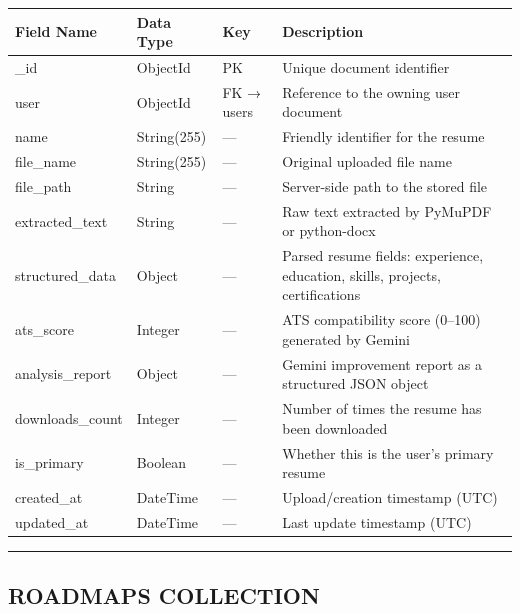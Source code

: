 \documentclass[12pt]{article}
\begin{document}
\begin{longtable}{|p{}|p{}|p{}|p{}|}
\hline
\textbf{Field Name} & \textbf{Data Type} & \textbf{Key} & \textbf{Description} \\ \hline
\endhead
\_id & ObjectId & PK & Unique document identifier \\ \hline
user & ObjectId & FK → users & Reference to the owning user document \\ \hline
name & String(255) & — & Friendly identifier for the resume \\ \hline
file\_name & String(255) & — & Original uploaded file name \\ \hline
file\_path & String & — & Server-side path to the stored file \\ \hline
extracted\_text & String & — & Raw text extracted by PyMuPDF or python-docx \\ \hline
structured\_data & Object & — & Parsed resume fields: experience, education, skills, projects, certifications \\ \hline
ats\_score & Integer & — & ATS compatibility score (0–100) generated by Gemini \\ \hline
analysis\_report & Object & — & Gemini improvement report as a structured JSON object \\ \hline
downloads\_count & Integer & — & Number of times the resume has been downloaded \\ \hline
is\_primary & Boolean & — & Whether this is the user's primary resume \\ \hline
created\_at & DateTime & — & Upload/creation timestamp (UTC) \\ \hline
updated\_at & DateTime & — & Last update timestamp (UTC) \\ \hline
\end{longtable}


\noindent\rule{\textwidth}{0.4pt}

\subsection{ROADMAPS COLLECTION}
\end{document}
